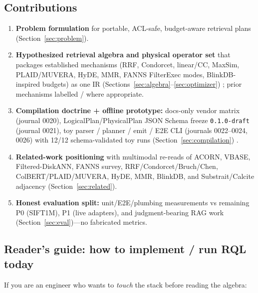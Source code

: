 \subsection{Contributions}
\label{sec:contributions}
\begin{enumerate}[leftmargin=*]
  \item \textbf{Problem formulation} for portable, ACL-safe, budget-aware retrieval plans (Section~\ref{sec:problem}).
  \item \textbf{Hypothesized retrieval algebra and physical operator set} that packages established mechanisms (RRF, Condorcet, linear/CC, MaxSim, PLAID/MUVERA, HyDE, MMR, FANNS FilterExec modes, BlinkDB-inspired budgets) as one IR (Sections~\ref{sec:algebra}--\ref{sec:optimizer}) \hypothesis{}; prior mechanisms labelled \established{} / \authoronly{} where appropriate.
  \item \textbf{Compilation doctrine + offline prototype:} docs-only vendor matrix (journal 0020), LogicalPlan/PhysicalPlan JSON Schema freeze \texttt{0.1.0-draft} (journal 0021), toy parser / planner / emit / E2E CLI (journals 0022--0024, 0026) with 12/12 schema-validated toy runs (Section~\ref{sec:compilation}) \hypothesis{}.
  \item \textbf{Related-work positioning} with multimodal re-reads of ACORN, VBASE, Filtered-DiskANN, FANNS survey, RRF/Condorcet/Bruch/Chen, ColBERT/PLAID/MUVERA, HyDE, MMR, BlinkDB, and Substrait/Calcite adjacency (Section~\ref{sec:related}).
  \item \textbf{Honest evaluation split:} unit/E2E/plumbing measurements vs remaining P0 (SIFT1M), P1 (live adapters), and judgment-bearing RAG work (Section~\ref{sec:eval})---no fabricated metrics.
\end{enumerate}

\subsection{Reader's guide: how to implement / run RQL today}
\label{sec:readers-guide}
If you are an engineer who wants to \emph{touch} the stack before reading the algebra:

